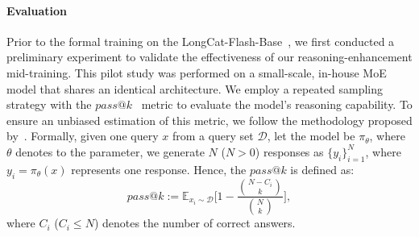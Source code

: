 






\noindent\paragraph{Evaluation}
Prior to the formal training on the LongCat-Flash-Base~\citep{meituan2025longcat_flash_chat}, we first conducted a preliminary experiment to validate the effectiveness of our reasoning-enhancement mid-training. 
This pilot study was performed on a small-scale, in-house MoE model that shares an identical architecture.
We employ a repeated sampling strategy with the $\mathit{pass@k}$~\citep{yue2025does, brown2024large} metric to evaluate the model's reasoning capability.
To ensure an unbiased estimation of this metric, we follow the methodology proposed by~\citet{chen2021evaluating}.
Formally, given one query $x$ from a query set $\mathcal{D}$, let the model be $\pi_{\theta}$, where $\theta$ denotes to the parameter, we generate $N$ ($N > 0$) responses as $\{y_i\}_{i=1}^{N}$, where $y_i=\pi_{\theta}(x)$ represents one response.
Hence, the $\mathit{pass@k}$ is defined as:
\begin{equation}
    pass@k := \mathbb{E}_{x_i\sim\mathcal{D}}\bigg[1 - \frac{{N - C_i \choose k}}{{N \choose k}}\bigg],
\end{equation}
where $C_i$ ($C_i \leq N$) denotes the number of correct answers.

